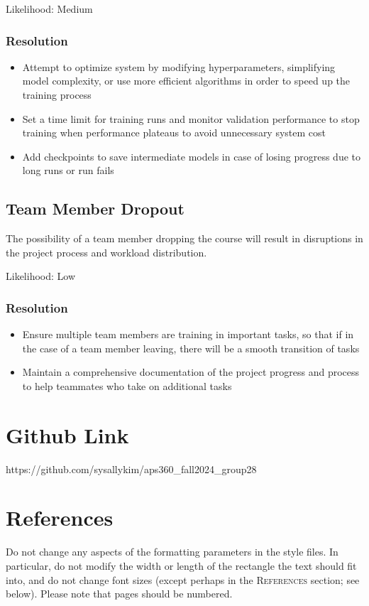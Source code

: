 \documentclass{article} %
\begin{document}
Likelihood: Medium
\subsubsection{Resolution}
\begin{itemize}
    \item Attempt to optimize system by modifying hyperparameters, simplifying model complexity, or use more efficient algorithms in order to speed up the training process
    \item Set a time limit for training runs and monitor validation performance to stop training when performance plateaus to avoid unnecessary system cost
    \item Add checkpoints to save intermediate models in case of losing progress due to long runs or run fails
\end{itemize}

\subsection{Team Member Dropout}
The possibility of a team member dropping the course will result in disruptions in the project process and workload distribution.

Likelihood: Low
\subsubsection{Resolution}
\begin{itemize}
    \item Ensure multiple team members are training in important tasks, so that if in the case of a team member leaving, there will be a smooth transition of tasks
    \item Maintain a comprehensive documentation of the project progress and process to help teammates who take on additional tasks
\end{itemize}

\section{Github Link}
https://github.com/sysallykim/aps360\_fall2024\_group28

\section{References}
Do not change any aspects of the formatting parameters in the style files.
In particular, do not modify the width or length of the rectangle the text
should fit into, and do not change font sizes (except perhaps in the
\textsc{References} section; see below). Please note that pages should be
numbered.
\end{document}
